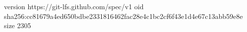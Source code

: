 version https://git-lfs.github.com/spec/v1
oid sha256:cc81679a4ed650bdbe2331816462fac28e4c1bc2cf6f43e1d4e67c13abb59e8e
size 2305
